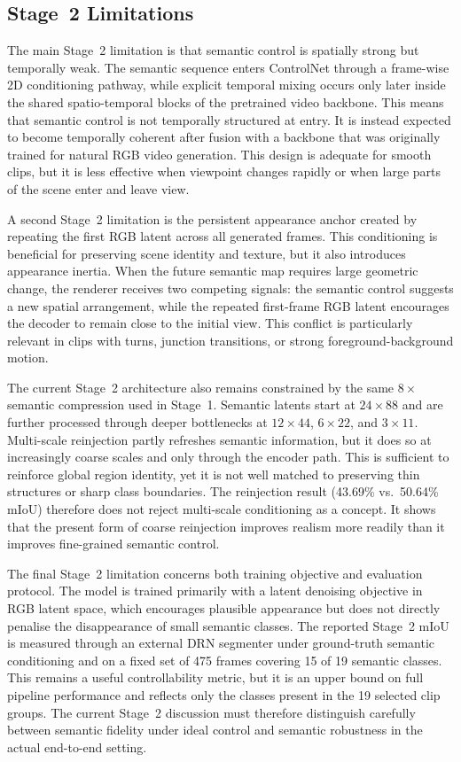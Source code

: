 \subsection{Stage~2 Limitations}
\label{subsec:stage2_limitations_detail}

The main Stage~2 limitation is that semantic control is spatially strong but temporally weak. The semantic sequence enters ControlNet through a frame-wise 2D conditioning pathway, while explicit temporal mixing occurs only later inside the shared spatio-temporal blocks of the pretrained video backbone. This means that semantic control is not temporally structured at entry. It is instead expected to become temporally coherent after fusion with a backbone that was originally trained for natural RGB video generation. This design is adequate for smooth clips, but it is less effective when viewpoint changes rapidly or when large parts of the scene enter and leave view.

A second Stage~2 limitation is the persistent appearance anchor created by repeating the first RGB latent across all generated frames. This conditioning is beneficial for preserving scene identity and texture, but it also introduces appearance inertia. When the future semantic map requires large geometric change, the renderer receives two competing signals: the semantic control suggests a new spatial arrangement, while the repeated first-frame RGB latent encourages the decoder to remain close to the initial view. This conflict is particularly relevant in clips with turns, junction transitions, or strong foreground-background motion.

The current Stage~2 architecture also remains constrained by the same $8\times$ semantic compression used in Stage~1. Semantic latents start at $24 \times 88$ and are further processed through deeper bottlenecks at $12 \times 44$, $6 \times 22$, and $3 \times 11$. Multi-scale reinjection partly refreshes semantic information, but it does so at increasingly coarse scales and only through the encoder path. This is sufficient to reinforce global region identity, yet it is not well matched to preserving thin structures or sharp class boundaries. The reinjection result (43.69\% vs.\ 50.64\% mIoU) therefore does not reject multi-scale conditioning as a concept. It shows that the present form of coarse reinjection improves realism more readily than it improves fine-grained semantic control.

The final Stage~2 limitation concerns both training objective and evaluation protocol. The model is trained primarily with a latent denoising objective in RGB latent space, which encourages plausible appearance but does not directly penalise the disappearance of small semantic classes. The reported Stage~2 mIoU is measured through an external DRN segmenter under ground-truth semantic conditioning and on a fixed set of 475 frames covering 15 of 19 semantic classes. This remains a useful controllability metric, but it is an upper bound on full pipeline performance and reflects only the classes present in the 19 selected clip groups. The current Stage~2 discussion must therefore distinguish carefully between semantic fidelity under ideal control and semantic robustness in the actual end-to-end setting.

